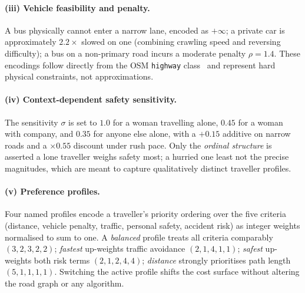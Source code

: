 \documentclass{ai-lab-report}
\begin{document}
\paragraph{(iii) Vehicle feasibility and penalty.} A bus physically cannot enter a narrow lane, encoded as $+\infty$; a private car 
is approximately $2.2\times$ slowed on one (combining crawling speed and reversing difficulty); a bus on a non-primary road incurs a
moderate penalty $\rho=1.4$. These encodings follow directly from the OSM \texttt{highway} class~\citep{boeing2017osmnx} and represent 
hard physical constraints, not approximations.

\paragraph{(iv) Context-dependent safety sensitivity.} The sensitivity $\sigma$ is set to $1.0$ for a 
woman travelling alone, $0.45$ for a woman with company, and $0.35$ for anyone else alone, with a $+0.15$ additive on narrow 
roads and a $\times0.55$ discount under rush pace. Only the \emph{ordinal structure} is asserted a lone traveller weighs safety most; 
a hurried one least not the precise magnitudes, which are meant to capture qualitatively distinct traveller profiles.

\paragraph{(v) Preference profiles.} Four named profiles encode a traveller's priority ordering over the five criteria 
(distance, vehicle penalty, traffic, personal safety, accident risk) as integer weights normalised to sum to one. 
A \emph{balanced} profile treats all criteria comparably $(3,2,3,2,2)$; \emph{fastest} up-weights traffic avoidance $(2,1,4,1,1)$; 
\emph{safest} up-weights both risk terms $(2,1,2,4,4)$; \emph{distance} strongly prioritises path length $(5,1,1,1,1)$. Switching the active profile shifts the cost surface without altering the road graph or any algorithm.
\end{document}
